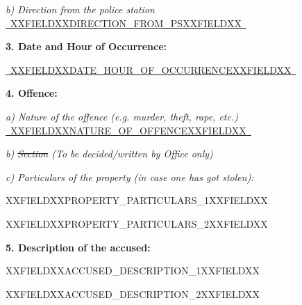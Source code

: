 \documentclass[12pt, a4paper]{article}
\newcommand{\fillline}[1]{\underline{~#1~}}
\begin{document}
\vspace{8pt}
\hspace{1cm}\textit{b) Direction from the police station} \fillline{XXFIELDXXDIRECTION_FROM_PSXXFIELDXX}

\vspace{12pt}

\noindent\textbf{3. Date and Hour of Occurrence:}

\vspace{4pt}
\hspace{1cm}\fillline{XXFIELDXXDATE_HOUR_OF_OCCURRENCEXXFIELDXX}

\vspace{12pt}

\noindent\textbf{4. Offence:}

\vspace{6pt}
\hspace{1cm}\textit{a) Nature of the offence (e.g. murder, theft, rape, etc.)} \fillline{XXFIELDXXNATURE_OF_OFFENCEXXFIELDXX}

\vspace{8pt}
\hspace{1cm}\textit{b) \sout{Section} \quad (To be decided/written by Office only)}

\vspace{8pt}
\hspace{1cm}\textit{c) Particulars of the property (in case one has got stolen):}

\vspace{4pt}
\hspace{1cm}XXFIELDXXPROPERTY_PARTICULARS_1XXFIELDXX

\vspace{4pt}
\hspace{1cm}XXFIELDXXPROPERTY_PARTICULARS_2XXFIELDXX

\vspace{12pt}

\noindent\textbf{5. Description of the accused:}

\vspace{4pt}
\hspace{1cm}XXFIELDXXACCUSED_DESCRIPTION_1XXFIELDXX

\vspace{4pt}
\hspace{1cm}XXFIELDXXACCUSED_DESCRIPTION_2XXFIELDXX
\end{document}
